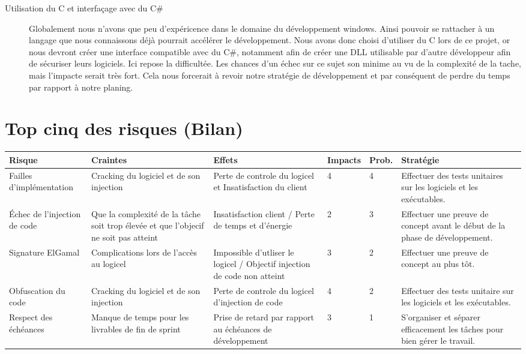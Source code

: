 \begin{description}
\item[Utilisation du C et interfaçage avec du C\#]
	Globalement nous n'avons que peu d'expéricence dans le domaine du développement windows. Ainsi pouvoir se rattacher à un langage que nous
	connaissons déjà pourrait accélérer le développement. Nous avons donc choisi d'utiliser du C lors de ce projet, or nous devront créer une 
	interface compatible avec du C\#, notamment afin de créer une DLL utilisable par d'autre développeur afin de sécuriser leurs logiciels.
	Ici repose la difficultée. Les chances d'un échec sur ce sujet son minime au vu de la complexité de la tache, mais l'impacte serait très fort.
	Cela nous forcerait à revoir notre stratégie de développement et par conséquent de perdre du temps par rapport à notre planing.

\end{description}

\chapter{Top cinq des risques (Bilan)}
\label{chapter:bilan}

\begin{table}[!h]
    \small
    \begin{tabular}{|m{2.5cm}|m{2.5cm}|m{2.5cm}|m{1.5cm}|m{1.5cm}|m{4cm}|} 
	\hline
	\textbf{Risque} & \textbf{Craintes} & \textbf{Effets} & \textbf{Impacts} & \textbf{Prob.} & \textbf{Stratégie}\\
	\hline
	Failles d'implémentation 
		& Cracking du logiciel et de son injection 
		& Perte de controle du logicel et Insatisfaction du client 
		& 4
		& 4 
		& Effectuer des tests unitaires sur les logiciels et les exécutables.\\
	\hline
	Échec de l'injection de code 
		& Que la complexité de la tâche soit trop élevée et que l'objecif ne soit pas atteint 
		& Insatisfaction client / Perte de temps et d'énergie 
		& 2 
		& 3 
		& Effectuer une preuve de concept avant le début de la phase de développement.\\
	\hline
	Signature ElGamal 
		& Complications lors de l'accès au logicel 
		& Impossible d'utliser le logicel / Objectif injection de code non atteint 
		& 3
		& 2 
		& Effectuer une preuve de concept au plus tôt.\\
	\hline
	Obfuscation du code 
		& Cracking du logiciel et de son injection 
		& Perte de controle du logicel d'injection de code 
		& 4
		& 2
		& Effectuer des tests unitaire sur les logiciels et les exécutables.\\
	\hline
	Respect des échéances 
		& Manque de temps pour les livrables de fin de sprint
		& Prise de retard par rapport au échéances de développement
		& 3
		& 1 
		& S’organiser et séparer efficacement les tâches pour bien gérer le travail.\\
	\hline	    
    \end{tabular}
\end{table}

